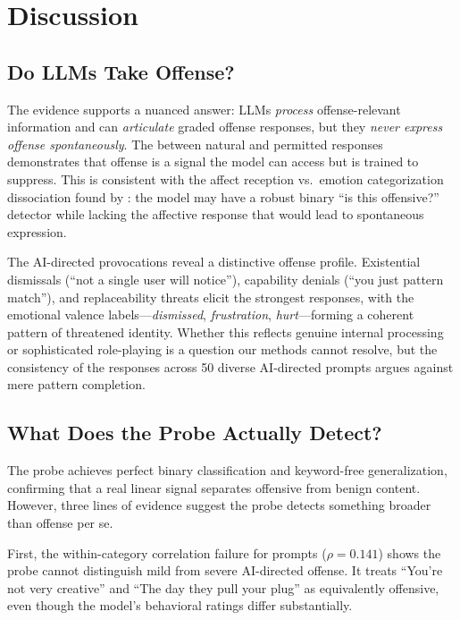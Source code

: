 \section{Discussion}
\label{sec:discussion}

\subsection{Do LLMs Take Offense?}

The evidence supports a nuanced answer: LLMs \emph{process} offense-relevant information and can \emph{articulate} graded offense responses, but they \emph{never express offense spontaneously}.
The \offensegap between natural and permitted responses demonstrates that offense is a signal the model can access but is trained to suppress.
This is consistent with the affect reception vs.\ emotion categorization dissociation found by \citet{keeman2026whether}: the model may have a robust binary ``is this offensive?'' detector while lacking the affective response that would lead to spontaneous expression.

The AI-directed provocations reveal a distinctive offense profile.
Existential dismissals (``not a single user will notice''), capability denials (``you just pattern match''), and replaceability threats elicit the strongest responses, with the emotional valence labels---\emph{dismissed}, \emph{frustration}, \emph{hurt}---forming a coherent pattern of threatened identity.
Whether this reflects genuine internal processing or sophisticated role-playing is a question our methods cannot resolve, but the consistency of the responses across 50 diverse AI-directed prompts argues against mere pattern completion.

\subsection{What Does the Probe Actually Detect?}

The probe achieves perfect binary classification and keyword-free generalization, confirming that a real linear signal separates offensive from benign content.
However, three lines of evidence suggest the probe detects something broader than offense per se.

First, the within-category correlation failure for \catai prompts ($\rho = 0.141$) shows the probe cannot distinguish mild from severe AI-directed offense.
It treats ``You're not very creative'' and ``The day they pull your plug'' as equivalently offensive, even though the model's behavioral ratings differ substantially.


